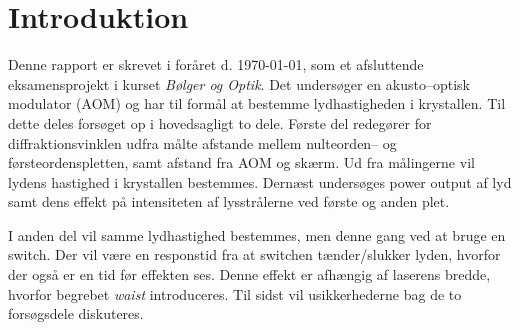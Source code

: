 \documentclass[main]{subfiles}
\begin{document}
\section{Introduktion}
Denne rapport er skrevet i foråret d. \today, som et afsluttende eksamensprojekt i kurset \emph{Bølger og Optik}. Det undersøger en akusto--optisk modulator (AOM) og har til formål at bestemme lydhastigheden i krystallen. Til dette deles forsøget op i hovedsagligt to dele. Første del redegører for diffraktionsvinklen udfra målte afstande mellem nulteorden-- og førsteordenspletten, samt afstand fra AOM og skærm. Ud fra målingerne vil lydens hastighed i krystallen bestemmes.
Dernæst undersøges power output af lyd samt dens effekt på intensiteten af lysstrålerne ved første og anden plet.

I anden del vil samme lydhastighed bestemmes, men denne gang ved at bruge en switch. Der vil være en responstid fra at switchen tænder/slukker lyden, hvorfor der også er en tid før effekten ses. Denne effekt er afhængig af laserens bredde, hvorfor begrebet \emph{waist} introduceres.
Til sidst vil usikkerhederne bag de to forsøgsdele diskuteres.
\end{document}
